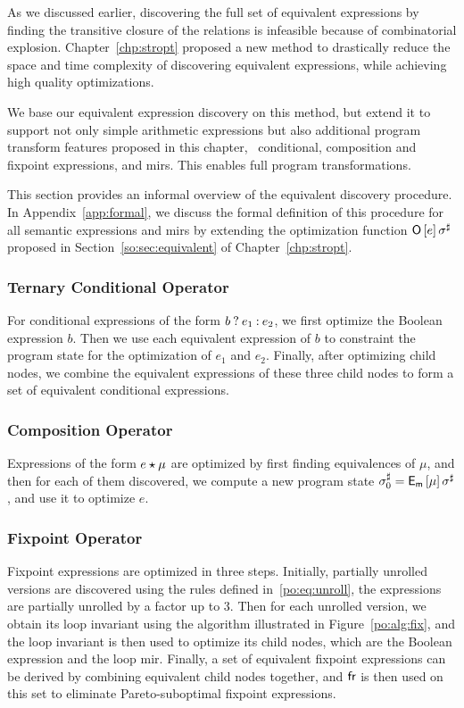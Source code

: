 As we discussed earlier, discovering the full set of equivalent expressions
by finding the transitive closure of the relations is infeasible because of
combinatorial explosion.  Chapter~\ref{chp:stropt} proposed a new method to
drastically reduce the space and time complexity of discovering equivalent
expressions, while achieving high quality optimizations.

We base our equivalent expression discovery on this method, but extend it to
support not only simple arithmetic expressions but also additional program
transform features proposed in this chapter, \ie~conditional, composition
and fixpoint expressions, and \glspl{mir}.  This enables full program
transformations.

This section provides an informal overview of the equivalent discovery
procedure.  In Appendix~\ref{app:formal}, we discuss the formal definition
of this procedure for all semantic expressions and \glspl{mir} by
extending the optimization function $\operatorname{\mathsf{O}}\left[e\right]\sigma^\sharp$ proposed in
Section~\ref{so:sec:equivalent} of Chapter~\ref{chp:stropt}.

\subsubsection{Ternary Conditional Operator}

For conditional expressions of the form $b\mathbin{?} e_1\mathbin{:} e_2$, we first
optimize the Boolean expression $b$.  Then we use each equivalent expression
of $b$ to constraint the program state for the optimization of $e_1$ and
$e_2$.  Finally, after optimizing child nodes, we combine the equivalent
expressions of these three child nodes to form a set of equivalent
conditional expressions.

\subsubsection{Composition Operator}

Expressions of the form $e \mathbin{\star} \mu$ are optimized by first finding
equivalences of $\mu$, and then for each of them discovered, we compute a new
program state $\sigma^\sharp_0 = \operatorname{\mathsf{E}_\mathsf{m}}\left[{\mu}\right] \sigma^\sharp$, and use it
to optimize $e$.

\subsubsection{Fixpoint Operator}

Fixpoint expressions are optimized in three steps.  Initially,
partially unrolled versions are discovered using the rules defined
in~\eqref{po:eq:unroll}, the expressions are partially unrolled by a factor up
to $3$.  Then for each unrolled version, we obtain its loop invariant using
the algorithm illustrated in Figure~\ref{po:alg:fix}, and the loop invariant
is then used to optimize its child nodes, which are the Boolean expression and
the loop \gls{mir}\@.  Finally, a set of equivalent fixpoint expressions can be
derived by combining equivalent child nodes together, and $\operatorname{\mathsf{fr}}$ is then
used on this set to eliminate Pareto-suboptimal fixpoint expressions.

